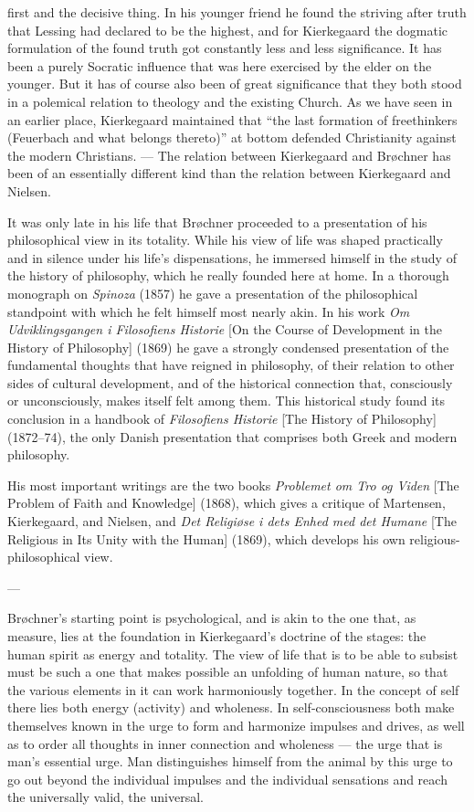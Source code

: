 \documentclass[12pt,a4paper]{book}
\newcommand{\opage}[1]{\marginnote{\footnotesize\textit{[#1]}}}
\begin{document}
first and the decisive thing. In his younger friend he found the striving after truth that
Lessing had declared to be the highest, and for Kierkegaard the dogmatic formulation of the found
truth got constantly less and less significance. It has been a purely Socratic influence that was
here exercised by the elder on the younger. But it has of course also been of great \opage{199}significance
that they both stood in a polemical relation to theology and the existing Church. As we have seen
in an earlier place, Kierkegaard maintained that ``the last formation of freethinkers (Feuerbach
and what belongs thereto)'' at bottom defended Christianity against the modern Christians. --- The
relation between Kierkegaard and Brøchner has been of an essentially different kind than the
relation between Kierkegaard and Nielsen.

It was only late in his life that Brøchner proceeded to a presentation of his philosophical view
in its totality. While his view of life was shaped practically and in silence under his life's
dispensations, he immersed himself in the study of the history of philosophy, which he really
founded here at home. In a thorough monograph on \emph{Spinoza} (1857) he gave a presentation of
the philosophical standpoint with which he felt himself most nearly akin. In his work \emph{Om
Udviklingsgangen i Filosofiens Historie} [On the Course of Development in the History of
Philosophy] (1869) he gave a strongly condensed presentation of the fundamental thoughts that
have reigned in philosophy, of their relation to other sides of cultural development, and of the
historical connection that, consciously or unconsciously, makes itself felt among them. This
historical study found its conclusion in a handbook of \emph{Filosofiens Historie} [The History
of Philosophy] (1872--74), the only Danish presentation that comprises both Greek and modern
philosophy.

His most important writings are the two books \emph{Problemet om Tro og Viden} [The Problem of
Faith and Knowledge] (1868), which gives a critique of Martensen, Kierkegaard, and Nielsen, and
\emph{Det Religiøse i dets Enhed med det Humane} [The Religious in Its Unity with the Human]
(1869), which develops his own religious-philosophical view.

\begin{center}---\end{center}

Brøchner's starting point is psychological, and is akin to the one that, as measure, lies at the
foundation in Kierkegaard's doctrine of the stages: the human spirit as energy and totality. The
view of life that is to be able to subsist must be such a one that makes possible an unfolding of
human nature, so that the various elements in it \opage{200}can work harmoniously together. In the concept
of self there lies both energy (activity) and wholeness. In self-consciousness both make
themselves known in the urge to form and harmonize impulses and drives, as well as to order all
thoughts in inner connection and wholeness --- the urge that is man's essential urge. Man
distinguishes himself from the animal by this urge to go out beyond the individual impulses and
the individual sensations and reach the universally valid, the universal.
\end{document}
